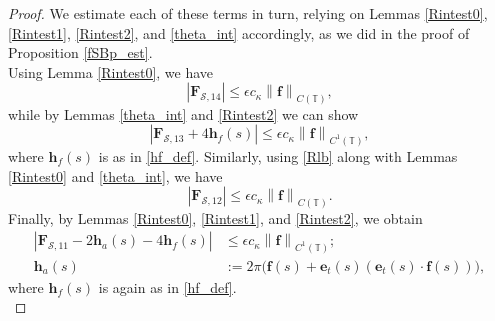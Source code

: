 \documentclass[11pt]{article}
\numberwithin{equation}{section}
\newcommand{\T}{\mathbb{T}}
\newcommand{\be}{\bm{e}}
\newcommand{\abs}[1]{\left\lvert #1 \right\rvert}
\newcommand{\norm}[1]{\left\lVert #1 \right\rVert}
\newcommand{\mc}[1]{\mathcal{#1}}
\theoremstyle{definition}
\begin{document}
\begin{proof}
We estimate each of these terms in turn, relying on Lemmas \ref{Rintest0}, \ref{Rintest1}, \ref{Rintest2}, and \ref{theta_int} accordingly, as we did in the proof of Proposition \ref{fSBp_est}. \\

Using Lemma \ref{Rintest0}, we have
\begin{equation}\label{FS14_est}
\abs{\bm{F}_{\mc{S},14}} \le \epsilon c_\kappa\norm{\bm{f}}_{C(\T)},
\end{equation}
while by Lemmas \ref{theta_int} and \ref{Rintest2} we can show
\begin{equation}\label{FS13_est}
 \abs{\bm{F}_{\mc{S},13} + 4\bm{h}_f(s)} \le \epsilon c_\kappa \norm{\bm{f}}_{C^1(\T)},
 \end{equation}
 where $\bm{h}_f(s)$ is as in \eqref{hf_def}. Similarly, using \eqref{Rlb} along with Lemmas \ref{Rintest0} and \ref{theta_int}, we have
 \begin{equation}\label{FS12_est}
  \abs{\bm{F}_{\mc{S},12}} \le \epsilon c_\kappa \norm{\bm{f}}_{C(\T)}.
 \end{equation}
Finally, by Lemmas \ref{Rintest0}, \ref{Rintest1}, and \ref{Rintest2}, we obtain
 \begin{equation}\label{FS11_est}
 \begin{aligned}
\abs{\bm{F}_{\mc{S},11}- 2\bm{h}_a(s)-4\bm{h}_f(s)} &\le \epsilon c_\kappa\norm{\bm{f}}_{C^1(\T)}; \\
\bm{h}_a(s) &:= 2\pi \big(\bm{f}(s) + \be_t(s)(\be_t(s)\cdot\bm{f}(s))\big),
\end{aligned}
\end{equation}
where $\bm{h}_f(s)$ is again as in \eqref{hf_def}. \\



\end{proof}
\end{document}
